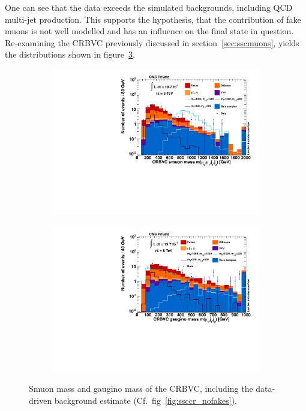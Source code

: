 One can see that the data exceeds the simulated backgrounds, including QCD multi-jet production. This supports the hypothesis, that the contribution of fake muons is not well modelled and has an influence on the final state in question. Re-examining the CRBVC previously discussed in section~\ref{sec:sscmuons}, yields the distributions shown in figure~\ref{fig:CRBVC}.

\begin{figure}[hb!]
  \centering
  \begin{subfigure}[b]{0.495\textwidth}
    \centering
    \includegraphics[width=\textwidth]{plots/CR6_m_smuon.pdf}
    \caption{\label{fig:CRBVC_m_smuon}}
  \end{subfigure}
  \begin{subfigure}[b]{0.495\textwidth}
    \centering
    \includegraphics[width=\textwidth]{plots/CR6_m_gaugino.pdf}
    \caption{\label{fig:CRBVC_m_gaugino}}
  \end{subfigure}

  \caption{Smuon mass and gaugino mass of the CRBVC, including the data-driven background estimate (Cf.~fig~\ref{fig:ssccr_nofakes}).}
  \label{fig:CRBVC}
\end{figure}

